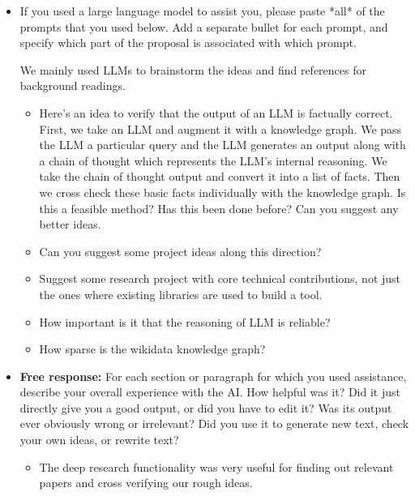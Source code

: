 \documentclass[11pt,a4paper]{article}
\begin{document}
\begin{itemize}
    \item  If you used a large language model to assist you, please paste *all* of the prompts that you used below. Add a separate bullet for each prompt, and specify which part of the proposal is associated with which prompt.

    We mainly used LLMs to brainstorm the ideas and find references for background readings. 
    \begin{itemize}
        \item Here's an idea to verify that the output of an LLM is factually correct. First, we take an LLM and augment it with a knowledge graph. We pass the LLM a particular query and the LLM generates an output along with a chain of thought which represents the LLM's internal reasoning. We take the chain of thought output and convert it into a list of facts. Then we cross check these basic facts individually with the knowledge graph. Is this a feasible method? Has this been done before? Can you suggest any better ideas.
        \item Can you suggest some project ideas along this direction?
        \item Suggest some research project with core technical contributions, not just the ones where existing libraries are used to build a tool.
        \item How important is it that the reasoning of LLM is reliable?
        \item How sparse is the wikidata knowledge graph?
    \end{itemize}
    \item \textbf{Free response:} For each section or paragraph for which you used assistance, describe your overall experience with the AI. How helpful was it? Did it just directly give you a good output, or did you have to edit it? Was its output ever obviously wrong or irrelevant? Did you use it to generate new text, check your own ideas, or rewrite text?
    \begin{itemize}
        \item The deep research functionality was very useful for finding out relevant papers and cross verifying our rough ideas. 
    \end{itemize}
\end{itemize}

\newpage

\footnotesize

\end{document}
